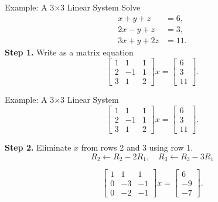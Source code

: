 \documentclass{beamer}
\begin{document}
\begin{frame}{Example: A 3$\times$3 Linear System}
Solve
\[
\begin{aligned}
x + y + z &= 6,\\
2x - y + z &= 3,\\
3x + y + 2z &= 11.
\end{aligned}
\]
\textbf{Step 1.} Write as a matrix equation
\[
\left[
\begin{array}{ccc}
1 & 1 & 1 \\
2 & -1 & 1 \\
3 & 1 & 2 
\end{array}
\right] x =
\left[
\begin{array}{c}
6 \\
3 \\
11
\end{array}
\right].
\]
\end{frame}

\begin{frame}{Example: A 3$\times$3 Linear System}
\[
\left[
\begin{array}{ccc}
1 & 1 & 1 \\
2 & -1 & 1 \\
3 & 1 & 2 
\end{array}
\right] x =
\left[
\begin{array}{c}
6 \\
3 \\
11
\end{array}
\right].
\]

\textbf{Step 2.} Eliminate \(x\) from rows 2 and 3 using row 1.
\[
R_2 \leftarrow R_2 - 2R_1,\quad
R_3 \leftarrow R_3 - 3R_1
\]

\[
\left[
\begin{array}{ccc}
1 & 1 & 1 \\
0 & -3 & -1 \\
0 & -2 & -1 
\end{array}
\right] x =
\left[
\begin{array}{c}
6 \\
-9 \\
-7
\end{array}
\right].
\]
\end{frame}
\end{document}
